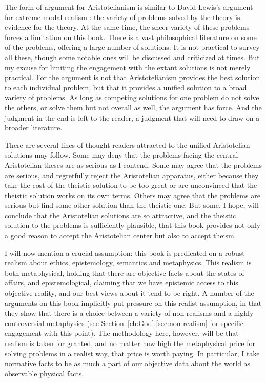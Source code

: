 The form of argument for Aristotelianism is similar to David Lewis's argument for extreme modal realism 
\parencite{LewisPlurality1986}: the variety of problems solved by the theory is evidence for the theory.
At the same time, the sheer variety of these problems forces a limitation on this book. There is a vast 
philosophical literature on some of the problems, offering a large number of solutions. It is not practical
to survey all these, though some notable ones will be discussed and criticized at times. But my excuse for 
limiting the engagement with the extant solutions is not merely practical. For the argument is not that 
Aristotelianism provides the best solution to each individual problem, but that it provides a unified solution
to a broad variety of problems. As long as competing solutions for one problem do not solve the others,
or solve them but not overall as well, the argument has force. And the judgment in the end is left to 
the reader, a judgment that will need to draw on a broader literature.

There are several lines of thought readers attracted to the unified Aristotelian solutions may  follow. Some
may deny that the problems facing the central Aristotelian theses are as serious as I contend. Some may agree that
the problems are serious, and regretfully reject the Aristotelian apparatus, either because they take the cost of 
the theistic solution to be too great or are unconvinced that the theistic solution works on its own terms. 
Others may agree that the problems are serious but find some other solution than the theistic one. But some, I hope, 
will conclude that the Aristotelian solutions are so attractive, and the theistic solution to the problems is sufficiently 
plausible, that this book provides not only a good reason to accept the Aristotelian center but also to accept
theism.

I will now mention a crucial assumption: this book is predicated on a robust realism about ethics, epistemology, semantics and 
metaphysics. This realism is both metaphysical, holding that there are objective facts about the states of affairs, and 
epistemological, claiming that we have epistemic access to this objective reality, and our best views about it tend to be 
right.  A number of the arguments on this book implicitly put pressure on this realist assumption, in that they show that 
there is a choice between a variety of non-realisms and a highly controversial metaphysics (see 
Section~\ref{ch:God}.\ref{sec:non-realism}
for specific engagement with this point). The methodology here, however, 
will be that realism is taken for granted, and no matter how high the metaphysical price for solving problems in a realist
way, that price is worth paying. In particular, I take normative facts to be as much a part of our objective data about 
the world as observable physical facts. 

